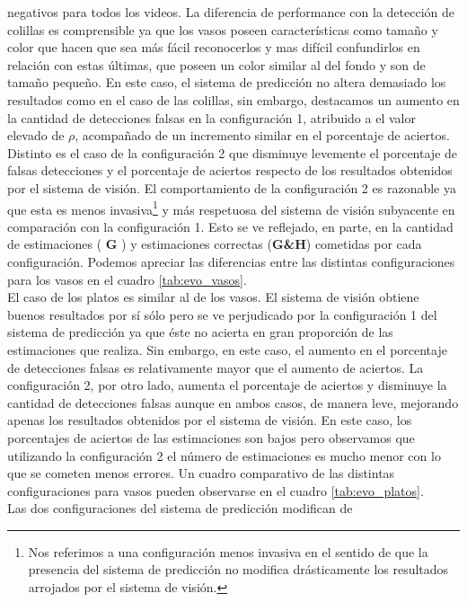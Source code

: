 negativos para todos los videos. La diferencia de performance con la 
detecci\'on de colillas es comprensible ya que los vasos poseen 
caracter\'isticas como tama\~no y color que hacen que sea m\'as f\'acil 
reconocerlos y mas dif\'icil confundirlos en relaci\'on con estas 
\'ultimas, que poseen un color similar al del fondo y son de tama\~no 
peque\~no. En este caso, el sistema de predicci\'on no altera demasiado 
los resultados como en el caso de las colillas, sin embargo, destacamos un 
aumento en la cantidad de detecciones falsas en la configuraci\'on 1, 
atribuido a el valor elevado de $\rho$, acompa\~nado de un incremento 
similar en el porcentaje de aciertos. Distinto es el caso de 
la configuraci\'on 2 que disminuye levemente el porcentaje de falsas 
detecciones y el porcentaje de aciertos respecto de los resultados
obtenidos por el sistema de visi\'on. El comportamiento de la 
configuraci\'on 2 es razonable ya que esta es menos 
invasiva\footnote{Nos referimos a una configuraci\'on menos invasiva en 
el sentido de que la presencia del sistema de predicci\'on no modifica 
dr\'asticamente los resultados arrojados por el sistema de visi\'on.} y m\'as respetuosa del sistema de visi\'on subyacente en 
comparaci\'on con la configuraci\'on 1. Esto se ve reflejado, en parte, 
en la cantidad de estimaciones ( \textbf{G} ) y estimaciones correctas 
(\textbf{G\&H}) cometidas por cada configuraci\'on. Podemos 
apreciar las diferencias entre las distintas configuraciones para los 
vasos en el cuadro \ref{tab:evo_vasos}.\\
\indent El caso de los platos es similar al de los vasos. El sistema de visi\'on 
obtiene buenos resultados por s\'i s\'olo pero se ve perjudicado por la configuraci\'on 1 del sistema de 
predicci\'on ya que \'este no acierta en gran proporci\'on de las estimaciones que realiza. 
Sin embargo, en este caso, el aumento en el porcentaje de detecciones 
falsas es relativamente mayor que el aumento de aciertos. 
La configuraci\'on 2, por otro lado, aumenta el 
porcentaje de aciertos y disminuye la cantidad de detecciones falsas 
aunque en ambos casos, de manera leve, mejorando apenas los resultados 
obtenidos por el sistema de visi\'on. En este caso, los porcentajes de 
aciertos de las estimaciones son bajos pero observamos que utilizando 
la configuraci\'on 2 el n\'umero de estimaciones es mucho menor con lo 
que se cometen menos errores. Un cuadro comparativo de las 
distintas configuraciones para vasos pueden observarse en el cuadro 
\ref{tab:evo_platos}.\\
\indent  Las dos configuraciones del sistema de predicci\'on modifican de 
